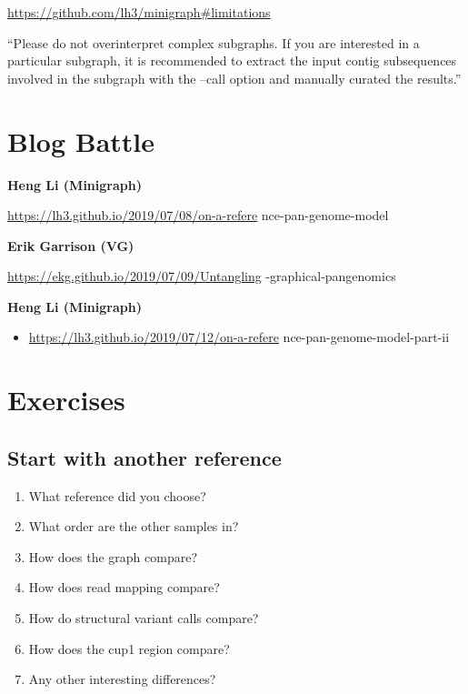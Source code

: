 \documentclass[
]{book}
\providecommand{\tightlist}{%
  \setlength{\itemsep}{0pt}\setlength{\parskip}{0pt}}
\begin{document}
\url{https://github.com/lh3/minigraph\#limitations}

``Please do not overinterpret complex subgraphs. If you are interested in a particular subgraph, it is recommended to extract the input contig subsequences involved in the subgraph with the --call option and manually curated the results.''

\hypertarget{blog-battle}{%
\section{Blog Battle}\label{blog-battle}}

\textbf{Heng Li (Minigraph)}

\url{https://lh3.github.io/2019/07/08/on-a-refere} nce-pan-genome-model

\textbf{Erik Garrison (VG)}

\url{https://ekg.github.io/2019/07/09/Untangling} -graphical-pangenomics

\textbf{Heng Li (Minigraph)}

\begin{itemize}
\tightlist
\item
  \url{https://lh3.github.io/2019/07/12/on-a-refere} nce-pan-genome-model-part-ii
\end{itemize}

\hypertarget{exercises}{%
\section{Exercises}\label{exercises}}

\hypertarget{start-with-another-reference}{%
\subsection*{Start with another reference}\label{start-with-another-reference}}

\begin{enumerate}
\def\labelenumi{\arabic{enumi}.}
\tightlist
\item
  What reference did you choose?
\item
  What order are the other samples in?
\item
  How does the graph compare?
\item
  How does read mapping compare?
\item
  How do structural variant calls compare?
\item
  How does the cup1 region compare?
\item
  Any other interesting differences?
\end{enumerate}
\end{document}
